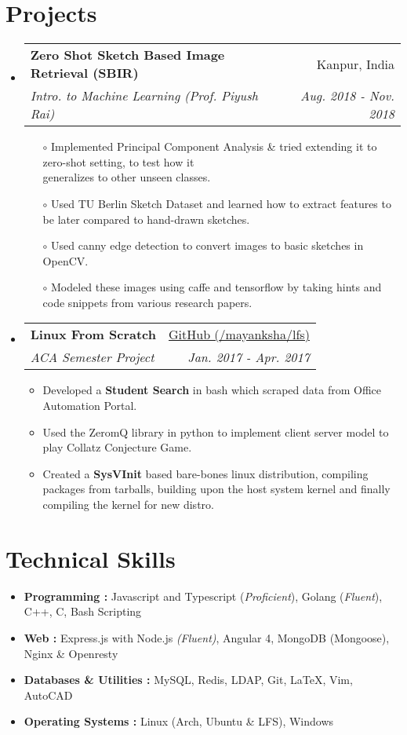 \documentclass[a4paper,20pt]{article}
\makeatletter
\newcommand{\resumeSubheading}[4]{
	\vspace{-1pt}\item
	\begin{tabular*}{0.97\textwidth}{l@{\extracolsep{\fill}}r}
		\textbf{#1} & #2 \\
		\textit{\small#3} & \textit{\small #4} \\
	\end{tabular*}\vspace{-7pt}
}
\newcommand{\resumeSubHeadingListStart}{\begin{itemize}[leftmargin=*]}
\newcommand{\resumeSubHeadingListEnd}{\end{itemize}}
\makeatother
\begin{document}
\section{Projects}
\resumeSubHeadingListStart
\resumeSubheading
		{Zero Shot Sketch Based Image Retrieval (SBIR)}{Kanpur, India}
{Intro. to Machine Learning (Prof. Piyush Rai)}{Aug. 2018 - Nov. 2018}
\vspace{2pt}
\begin{itemize}
	\item[$\circ$] Implemented Principal Component Analysis \& tried extending it to zero-shot setting, to test how it \\ generalizes to other unseen classes.
	\item[$\circ$] Used TU Berlin Sketch Dataset and learned how to extract features to be later compared to hand-drawn sketches. 
	\item[$\circ$] Used canny edge detection to convert images to basic sketches in OpenCV. 
	\item[$\circ$] Modeled these images using caffe and tensorflow by taking hints and code snippets from various research papers.
\end{itemize}
\resumeSubheading
{Linux From Scratch}{ \textbf{\hfill}\href{https://github.com/mayanksha/lfs} {\faGithub \hspace{0.1em} GitHub (/mayanksha/lfs)}}
{ACA Semester Project}{Jan. 2017 - Apr. 2017}
\vspace{2pt}
	\begin{itemize}
				\item Developed a {\bf Student Search} in bash which scraped data from Office Automation Portal. 
				\item Used the ZeromQ library in python to implement client server model to play Collatz Conjecture Game.
				\item Created a \textbf{SysVInit} based bare-bones linux distribution, compiling packages from tarballs, building upon the host system kernel and finally compiling the kernel for new distro.
	\end{itemize}
\resumeSubHeadingListEnd

\section{Technical Skills}
\begin{itemize}[noitemsep]
	\item
		\textbf{Programming : }
		Javascript and Typescript (\textit{Proficient}), Golang (\textit{Fluent}), C++, C, Bash Scripting
	\item
		\textbf{Web : }
		Express.js with Node.js \textit{(Fluent)}, Angular 4, MongoDB (Mongoose), Nginx \& Openresty 

	\item
		\textbf{Databases \& Utilities : }
		MySQL, Redis, LDAP, Git, \LaTeX, Vim, AutoCAD
	\item
		\textbf{Operating Systems : }
		Linux (Arch, Ubuntu \& LFS), Windows
		\vspace*{-5pt}

\end{itemize}
\vspace*{-8pt}
\end{document}
